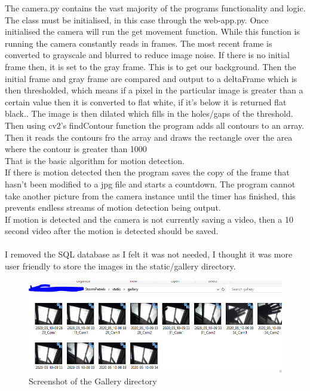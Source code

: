     The camera.py contains the vast majority of the programs functionality and logic. \\The class must be initialised, in this case through the web-app.py. Once initialised the camera will run the get movement function. While this function is running the camera constantly reads in frames. The most recent frame is converted to grayscale and blurred to reduce image noise. If there is no initial frame then, it is set to the gray frame. This is to get our background. Then the initial frame and gray frame are compared and output to a deltaFrame which is then thresholded, which means if a pixel in the particular image is greater than a certain value then it is converted to flat white, if it's below it is returned flat black.\cite{openCVThresh}. The image is then dilated which fills in the holes/gaps of the threshold. \\ Then using cv2's findContour function the program adds all contours to an array. Then it reads the contours fro the array and draws the rectangle over the area where the contour is greater than 1000 \\ That is the basic algorithm for motion detection. \\ If there is motion detected then the program saves the copy of the frame that hasn't been modified to a jpg file and starts a countdown. The program cannot take another picture from the camera instance until the timer has finished, this prevents endless streams of motion detection being output.\\ If motion is detected and the camera is not currently saving a video, then a 10 second video after the motion is detected should be saved.
      \\\\I removed the SQL database as I felt it was not needed, I thought it was more user friendly to store the images in the static/gallery directory. 
     \begin{figure}[!htbp] 
         \centering
         \includegraphics[scale=1]{img/gallery.PNG}
         \caption{Screenshot of the Gallery directory}
         \label{fig:my_label}
     \end{figure}   
